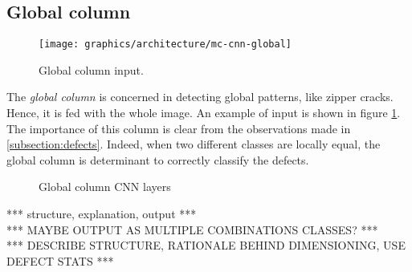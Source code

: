     \subsection{Global column}\label{section:global-column}
        \begin{figure}
            \centering
            \texttt{[image: graphics/architecture/mc-cnn-global]}
            \caption{Global column input.}\label{fig:mc-cnn:global-input}
        \end{figure}
        \par{
            The \emph{global column} is concerned in detecting global patterns, like zipper cracks. Hence, it is fed with the whole image. An example of input is shown in figure \ref{fig:mc-cnn:global-input}. The importance of this column is clear from the observations made in \ref{subsection:defects}. Indeed, when two different classes are locally equal, the global column is determinant to correctly classify the defects.
        }
        \begin{figure}
            \centering
            \caption{Global column CNN layers}\label{fig:mc-cnn:global-structure}
        \end{figure}
        \par{
            *** structure, explanation, output ***\\
            *** MAYBE OUTPUT AS MULTIPLE COMBINATIONS CLASSES? *** \\
            *** DESCRIBE STRUCTURE, RATIONALE BEHIND DIMENSIONING, USE DEFECT STATS ***
        }

